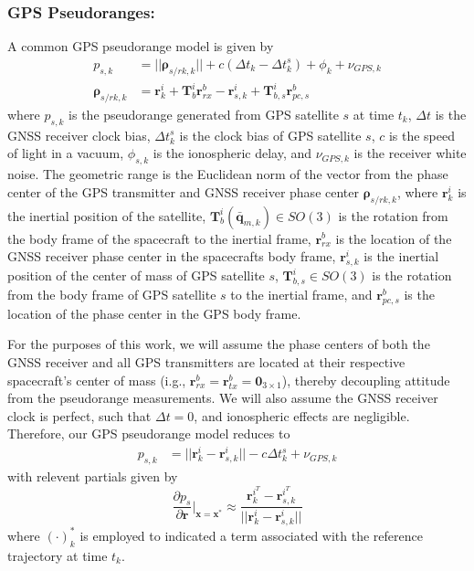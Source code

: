 \documentclass[letterpaper, submit]{AAS}			%
\begin{document}
\subsubsection{GPS Pseudoranges:}
A common GPS pseudorange model is given by \cite{Tapley_2004, Craft_2020}
\begin{align}
	p_{s,k} &= ||\boldsymbol{\rho}_{s/rk,k}|| + c(\Delta t_k - \Delta t_k^s) + \phi_k + \nu_{GPS,k} \\
	\boldsymbol{\rho}_{s/rk,k} &= \mathbf{r}_k^i + \mathbf{T}_b^i\mathbf{r}_{rx}^b - \mathbf{r}_{s,k}^i + \mathbf{T}_{b,s}^i\mathbf{r}_{pc,s}^b
\end{align}
where $p_{s,k}$ is the pseudorange generated from GPS satellite $s$ at time $t_k$, $\Delta t$ is the GNSS receiver clock bias, $\Delta t_k^s$ is the clock bias of GPS satellite $s$, $c$ is the speed of light in a vacuum, $\phi_{s,k}$ is the ionospheric delay, and $\nu_{GPS,k}$ is the receiver white noise. The geometric range is the Euclidean norm of the vector from the phase center of the GPS transmitter and GNSS receiver phase center $\boldsymbol{\rho}_{s/rk,k}$, where $\mathbf{r}_k^i$ is the inertial position of the satellite, $\mathbf{T}_b^i(\bar{\mathbf{q}}_{m,k}) \in SO(3)$ is the rotation from the body frame of the spacecraft to the inertial frame, $\mathbf{r}_{rx}^b$ is the location of the GNSS receiver phase center in the spacecrafts body frame, $\mathbf{r}_{s,k}^i$ is the inertial position of the center of mass of GPS satellite $s$, $\mathbf{T}_{b,s}^i\in SO(3)$ is the rotation from the body frame of GPS satellite $s$ to the inertial frame, and $\mathbf{r}_{pc,s}^b$ is the location of the phase center in the GPS body frame.

For the purposes of this work, we will assume the phase centers of both the GNSS receiver and all GPS transmitters are located at their respective spacecraft's center of mass (i.g., $\mathbf{r}_{rx}^b = \mathbf{r}_{tx}^b = \mathbf{0}_{3\times1}$), thereby decoupling attitude from the pseudorange measurements. We will also assume the GNSS receiver clock is perfect, such that $\Delta t = 0$, and ionospheric effects are negligible. Therefore, our GPS pseudorange model reduces to
\begin{align}
	p_{s,k} &= ||\mathbf{r}_k^i - \mathbf{r}_{s,k}^i|| - c\Delta t_k^s + \nu_{GPS,k}
\end{align}
with relevent partials given by
\begin{equation}
	\frac{\partial p_s}{\partial \mathbf{r}}\bigg|_{\mathbf{x}=\mathbf{x}^*} \approx \frac{\mathbf{r}_k^{i^T} - \mathbf{r}_{s,k}^{i^T}}{||\mathbf{r}_k^i - \mathbf{r}_{s,k}^i||}
\end{equation}
where $(\cdot)^*_k$ is employed to indicated a term associated with the reference trajectory at time $t_k$.
\end{document}
